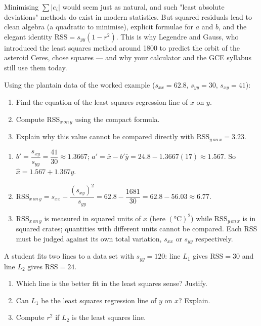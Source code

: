 \documentclass[11pt]{article}
\begin{document}
\begin{savaistu}
Minimising $\sum |e_i|$ would seem just as natural, and such "least absolute deviations" methods do exist in modern statistics. But squared residuals lead to clean algebra (a quadratic to minimise), explicit formulae for $a$ and $b$, and the elegant identity $\mathrm{RSS} = s_{yy}(1 - r^2)$. This is why Legendre and Gauss, who introduced the least squares method around 1800 to predict the orbit of the asteroid Ceres, chose squares — and why your calculator and the GCE syllabus still use them today.
\end{savaistu}

\begin{exercice}
Using the plantain data of the worked example ($s_{xx} = 62.8$, $s_{yy} = 30$, $s_{xy} = 41$):
\begin{enumerate}
\item Find the equation of the least squares regression line of $x$ on $y$.
\item Compute $\mathrm{RSS}_{x\,on\,y}$ using the compact formula.
\item Explain why this value cannot be compared directly with $\mathrm{RSS}_{y\,on\,x} = 3.23$.
\end{enumerate}
\end{exercice}

\begin{corrige}[Exercise 1]
\begin{enumerate}
\item $b' = \dfrac{s_{xy}}{s_{yy}} = \dfrac{41}{30} \approx 1.3667$; $a' = \bar{x} - b'\bar{y} = 24.8 - 1.3667(17) \approx 1.567$. So $\hat{x} = 1.567 + 1.367y$.
\item $\mathrm{RSS}_{x\,on\,y} = s_{xx} - \dfrac{(s_{xy})^2}{s_{yy}} = 62.8 - \dfrac{1681}{30} = 62.8 - 56.03 \approx 6.77$.
\item $\mathrm{RSS}_{x\,on\,y}$ is measured in squared units of $x$ (here $(°\mathrm{C})^2$) while $\mathrm{RSS}_{y\,on\,x}$ is in squared crates; quantities with different units cannot be compared. Each RSS must be judged against its own total variation, $s_{xx}$ or $s_{yy}$ respectively.
\end{enumerate}
\end{corrige}

\begin{exercice}
A student fits two lines to a data set with $s_{yy} = 120$: line $L_1$ gives $\mathrm{RSS} = 30$ and line $L_2$ gives $\mathrm{RSS} = 24$.
\begin{enumerate}
\item Which line is the better fit in the least squares sense? Justify.
\item Can $L_1$ be the least squares regression line of $y$ on $x$? Explain.
\item Compute $r^2$ if $L_2$ is the least squares line.
\end{enumerate}
\end{exercice}
\end{document}
